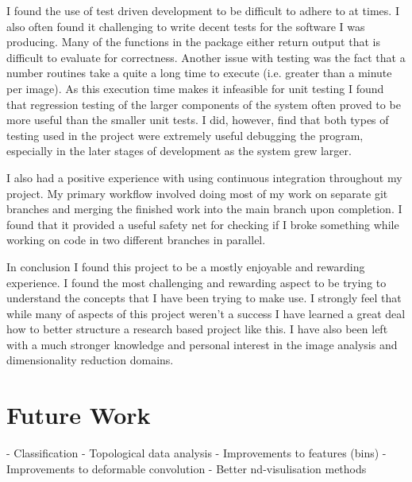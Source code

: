 I found the use of test driven development to be difficult to adhere to at times. I also often found it challenging to write decent tests for the software I was producing. Many of the functions in the package either return output that is difficult to evaluate for correctness. Another issue with testing was the fact that a number routines take a quite a long time to execute (i.e. greater than a minute per image). As this execution time makes it infeasible for unit testing I found that regression testing of the larger components of the system often proved to be more useful than the smaller unit tests. I did, however, find that both types of testing used in the project were extremely useful debugging the program, especially in the later stages of development as the system grew larger. 

I also had a positive experience with using continuous integration throughout my project. My primary workflow involved doing most of my work on separate git branches and merging the finished work into the main branch upon completion. I found that it provided a useful safety net for checking if I broke something while working on code in two different branches in parallel.

In conclusion I found this project to be a mostly enjoyable and rewarding experience. I found the most challenging and rewarding aspect to be trying to understand the concepts that I have been trying to make use. I strongly feel that while many of aspects of this project weren't a success I have learned a great deal how to better structure a research based project like this. I have also been left with a much stronger knowledge and personal interest in the image analysis and dimensionality reduction domains.


\section{Future Work}
\label{sec:future-work}

 - Classification
 - Topological data analysis
 - Improvements to features (bins)
 - Improvements to deformable convolution
 - Better nd-visulisation methods
 